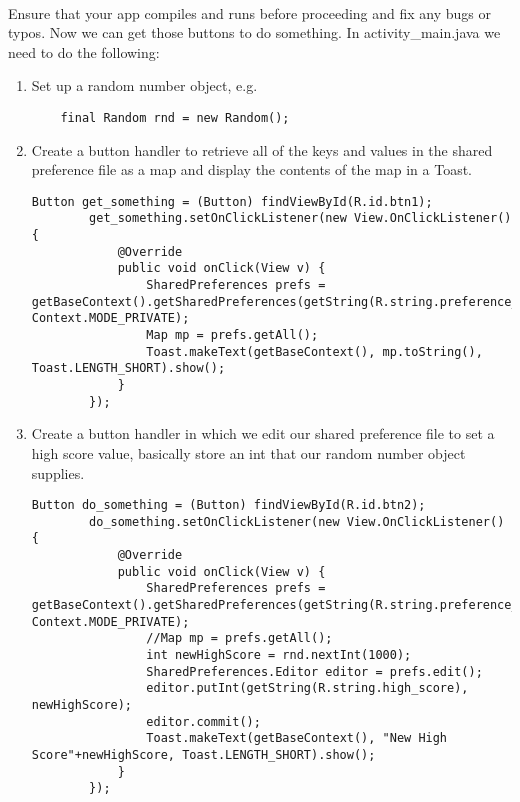 \paragraph{} Ensure that your app compiles and runs before proceeding and fix any bugs or typos. Now we can get those buttons to do something. In activity\_main.java we need to do the following:

\begin{enumerate}
\item Set up a random number object, e.g.
\begin{lstlisting}
    final Random rnd = new Random();
\end{lstlisting}
\item Create a button handler to retrieve all of the keys and values in the shared preference file as a map and display the contents of the map in a Toast.
\begin{lstlisting}
Button get_something = (Button) findViewById(R.id.btn1);
        get_something.setOnClickListener(new View.OnClickListener() {
            @Override
            public void onClick(View v) {
                SharedPreferences prefs = getBaseContext().getSharedPreferences(getString(R.string.preference_file_name), Context.MODE_PRIVATE);
                Map mp = prefs.getAll();
                Toast.makeText(getBaseContext(), mp.toString(), Toast.LENGTH_SHORT).show();
            }
        });
\end{lstlisting}
\item Create a button handler in which we edit our shared preference file to set a high score value, basically store an int that our random number object supplies.
\begin{lstlisting}
Button do_something = (Button) findViewById(R.id.btn2);
        do_something.setOnClickListener(new View.OnClickListener() {
            @Override
            public void onClick(View v) {
                SharedPreferences prefs = getBaseContext().getSharedPreferences(getString(R.string.preference_file_name), Context.MODE_PRIVATE);
                //Map mp = prefs.getAll();
                int newHighScore = rnd.nextInt(1000);
                SharedPreferences.Editor editor = prefs.edit();
                editor.putInt(getString(R.string.high_score), newHighScore);
                editor.commit();
                Toast.makeText(getBaseContext(), "New High Score"+newHighScore, Toast.LENGTH_SHORT).show();
            }
        });
\end{lstlisting}
\end{enumerate}

